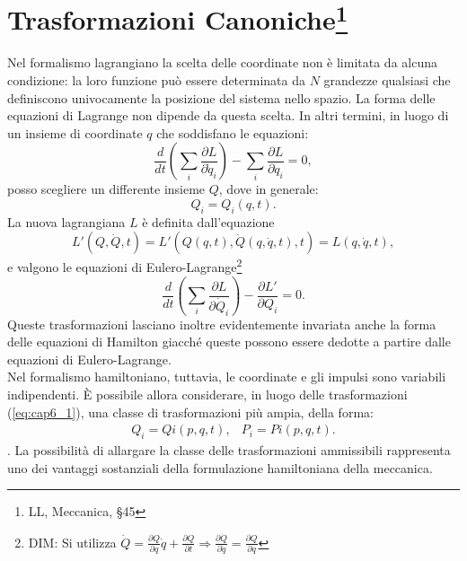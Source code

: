 \documentclass[a4paper,12pt,oneside]{book}
\begin{document}
\section[Trasformazioni Canoniche]{Trasformazioni Canoniche\footnote{LL, Meccanica, \S 45}}
Nel formalismo lagrangiano la scelta delle coordinate non \`e limitata da alcuna condizione: la loro funzione pu\`o essere determinata da $N$ grandezze qualsiasi che definiscono univocamente la posizione del sistema nello spazio. La forma delle equazioni di Lagrange non dipende da questa scelta. In altri termini, in luogo di un insieme di coordinate $q$ che soddisfano le equazioni:
\begin{equation}
\frac{d}{dt}  \left( \sum_i\frac{\partial L}{\partial \dot{q}_i} \right) - \sum_i \frac{\partial L}{\partial q_i} = 0 ,
\end{equation}
posso scegliere un differente insieme $Q$, dove in generale:
\begin{equation}
Q_i = Q_i(q,t) .
\label{eq:cap6_1}
\end{equation}
La nuova lagrangiana $L$ \`e definita dall'equazione
\begin{equation}
L'(Q,\dot{Q},t) = L'\left(Q(q,t), \dot {Q}(q, \dot{q}, t), t \right) = L(q,\dot{q},t) ,
\end{equation}
e valgono le equazioni di Eulero-Lagrange\footnote{DIM: Si utilizza $\dot{Q} = \frac{\partial Q}{\partial q}\dot{q} + \frac{\partial Q}{\partial t} \Rightarrow \frac{\partial \dot{Q}}{\partial \dot{q}} = \frac{\partial Q}{\partial q}$ }
\begin{equation}
\frac{d}{dt} \left( \sum_i \frac{\partial L}{\partial \dot{Q}_i} \right) - \frac{\partial L'}{\partial Q_i} = 0 .
\end{equation}
Queste trasformazioni lasciano inoltre evidentemente invariata anche la forma delle equazioni di Hamilton giacch\'e queste possono essere dedotte a partire dalle equazioni di Eulero-Lagrange.\\
Nel formalismo hamiltoniano, tuttavia, le coordinate e gli impulsi sono variabili indipendenti. \`E possibile allora considerare, in luogo delle trasformazioni (\ref{eq:cap6_1}), una classe di trasformazioni pi\`u ampia, della forma:
\begin{equation}
\begin{matrix}
Q_i = Qi(p,q,t),  & P_i = Pi(p,q,t) .
\end{matrix}
\label{eq:cap6_2}
\end{equation}.
La possibilit\`a di allargare la classe delle trasformazioni ammissibili rappresenta uno dei vantaggi sostanziali della formulazione hamiltoniana della meccanica.
\end{document}
